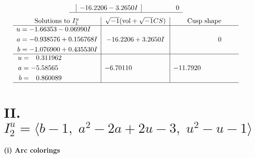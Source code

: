 \documentclass[1p]{elsarticle_modified}
\theoremstyle{definition}
\newcommand{\I}{\sqrt{-1}}
\begin{document}
$$\begin{array}{c|c|c}
 & -16.2206 - 3.2650 I & \phantom{-0.000000 } 0\\
 \hline 
 \end{array}$$\newpage$$\begin{array}{c|c|c}  
\text{Solutions to }I^u_{1}& \I (\text{vol} + \sqrt{-1}CS) & \text{Cusp shape}\\
 \hline 
\begin{aligned}
u &= -1.66353 - 0.06990 I \\
a &= -0.938576 + 0.156768 I \\
b &= -1.076900 + 0.435530 I\end{aligned}
 & -16.2206 + 3.2650 I & \phantom{-0.000000 } 0 \\ \hline\begin{aligned}
u &= \phantom{-}0.311962\phantom{ +0.000000I} \\
a &= -5.58565\phantom{ +0.000000I} \\
b &= \phantom{-}0.860089\phantom{ +0.000000I}\end{aligned}
 & -6.70110\phantom{ +0.000000I} & -11.7920\phantom{ +0.000000I}\\
 \hline 
 \end{array}$$\newpage\newpage\renewcommand{\arraystretch}{1}
\centering \section*{II. $I^u_{2}= \langle b-1,\;a^2-2 a+2 u-3,\;u^2- u-1 \rangle$}
\flushleft \textbf{(i) Arc colorings}\\
\end{document}
